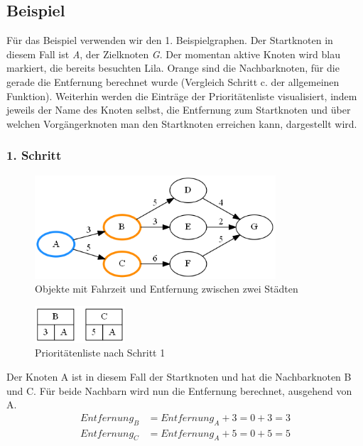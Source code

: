 \documentclass[11pt]{scrreprt}
\begin{document}
		\newpage
		\subsection{Beispiel}
		Für das Beispiel verwenden wir den 1. Beispielgraphen. Der Startknoten in diesem Fall ist \textit{A}, der Zielknoten \textit{G}. Der momentan aktive Knoten wird blau markiert, die bereits besuchten Lila. Orange sind die Nachbarknoten, für die gerade die Entfernung berechnet wurde (Vergleich Schritt c. der allgemeinen Funktion).
		Weiterhin werden die Einträge der Prioritätenliste visualisiert, indem jeweils der Name des Knoten selbst, die Entfernung zum Startknoten und über welchen Vorgängerknoten man den Startknoten erreichen kann, dargestellt wird.
			\subsubsection{1. Schritt}
			\begin{figure}[ht]
				\centering
				\includegraphics[width=0.8\textwidth]{Graphs/Example1}
				\caption{Objekte mit Fahrzeit und Entfernung zwischen zwei Städten}
			\end{figure}
			\begin{figure}[ht!]
				\centering
				\includegraphics[width=0.3\textwidth]{Graphs/Example1_PQ}
				\caption{Prioritätenliste nach Schritt 1}
			\end{figure}
			Der Knoten A ist in diesem Fall der Startknoten und hat die Nachbarknoten B und C.
			Für beide Nachbarn wird nun die Entfernung berechnet, ausgehend von A.
			\begin{align*}
					Entfernung_B &= Entfernung_A + 3 = 0 + 3 = 3\\
					Entfernung_C &= Entfernung_A + 5 = 0 + 5 = 5
			\end{align*}
			
\end{document}
